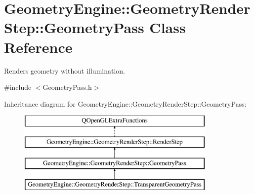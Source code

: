 \hypertarget{class_geometry_engine_1_1_geometry_render_step_1_1_geometry_pass}{}\section{Geometry\+Engine\+::Geometry\+Render\+Step\+::Geometry\+Pass Class Reference}
\label{class_geometry_engine_1_1_geometry_render_step_1_1_geometry_pass}


Renders geometry without illumination.  




{\ttfamily \#include $<$Geometry\+Pass.\+h$>$}

Inheritance diagram for Geometry\+Engine\+::Geometry\+Render\+Step\+::Geometry\+Pass\+:\begin{figure}[H]
\begin{center}
\leavevmode
\includegraphics[height=4.000000cm]{class_geometry_engine_1_1_geometry_render_step_1_1_geometry_pass}
\end{center}
\end{figure}

